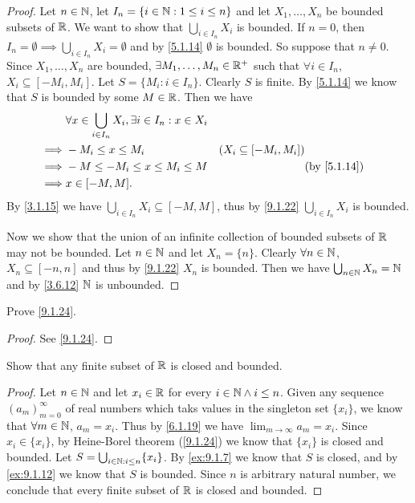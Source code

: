 \begin{proof}
  Let \(n \in \mathbb{N}\), let \(I_n = \{i \in \mathbb{N} : 1 \leq i \leq n\}\) and let \(X_1, \dots, X_n\) be bounded subsets of \(\mathbb{R}\).
  We want to show that \(\bigcup_{i \in I_n} X_i\) is bounded.
  If \(n = 0\), then \(I_n = \emptyset \implies \bigcup_{i \in I_n} X_i = \emptyset\) and by \cref{5.1.14} \(\emptyset\) is bounded.
  So suppose that \(n \neq 0\).
  Since \(X_1, \dots, X_n\) are bounded, \(\exists M_1, \dots, M_n \in \mathbb{R}^+\) such that \(\forall i \in I_n\), \(X_i \subseteq [-M_i, M_i]\).
  Let \(S = \{M_i : i \in I_n\}\).
  Clearly \(S\) is finite.
  By \cref{5.1.14} we know that \(S\) is bounded by some \(M \in \mathbb{R}\).
  Then we have
  \begin{align*}
             & \forall x \in \bigcup_{i \in I_n} X_i, \exists i \in I_n : x \in X_i                                             \\
    \implies & -M_i \leq x \leq M_i                                                 & (X_i \subseteq [-M_i, M_i])               \\
    \implies & -M \leq -M_i \leq x \leq M_i \leq M                                  &                             & \by{5.1.14} \\
    \implies & x \in [-M, M].
  \end{align*}
  By \cref{3.1.15} we have \(\bigcup_{i \in I_n} X_i \subseteq [-M, M]\), thus by \cref{9.1.22} \(\bigcup_{i \in I_n} X_i\) is bounded.

  Now we show that the union of an infinite collection of bounded subsets of \(\mathbb{R}\) may not be bounded.
  Let \(n \in \mathbb{N}\) and let \(X_n = \{n\}\).
  Clearly \(\forall n \in \mathbb{N}\), \(X_n \subseteq [-n, n]\) and thus by \cref{9.1.22} \(X_n\) is bounded.
  Then we have \(\bigcup_{n \in \mathbb{N}} X_n = \mathbb{N}\) and by \cref{3.6.12} \(\mathbb{N}\) is unbounded.
\end{proof}

\begin{ex}\label{ex:9.1.13}
  Prove \cref{9.1.24}.
\end{ex}

\begin{proof}
  See \cref{9.1.24}.
\end{proof}

\begin{ex}\label{ex:9.1.14}
  Show that any finite subset of \(\mathbb{R}\) is closed and bounded.
\end{ex}

\begin{proof}
  Let \(n \in \mathbb{N}\) and let \(x_i \in \mathbb{R}\) for every \(i \in \mathbb{N} \land i \leq n\).
  Given any sequence \((a_m)_{m = 0}^\infty\) of real numbers which taks values in the singleton set \(\{x_i\}\), we know that \(\forall m \in \mathbb{N}\), \(a_m = x_i\).
  Thus by \cref{6.1.19} we have \(\lim_{m \to \infty} a_m = x_i\).
  Since \(x_i \in \{x_i\}\), by Heine-Borel theorem (\cref{9.1.24}) we know that \(\{x_i\}\) is closed and bounded.
  Let \(S = \bigcup_{i \in \mathbb{N} : i \leq n} \{x_i\}\).
  By \cref{ex:9.1.7} we know that \(S\) is closed, and by \cref{ex:9.1.12} we know that \(S\) is bounded.
  Since \(n\) is arbitrary natural number, we conclude that every finite subset of \(\mathbb{R}\) is closed and bounded.
\end{proof}


